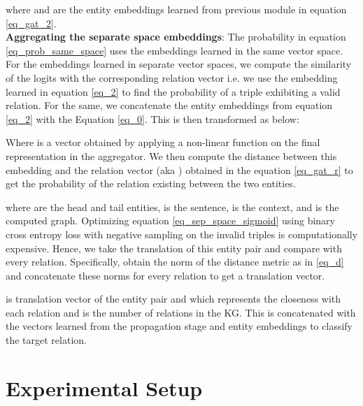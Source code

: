 \documentclass[sigconf]{acmart}
\begin{document}
where  and  are the entity embeddings learned from previous module in equation \ref{eq_gat_2}. \\
\textbf{Aggregating the separate space embeddings}: The probability in equation \ref{eq_prob_same_space} uses the embeddings learned in the same vector space. For the embeddings learned in separate vector spaces, we compute the similarity of the logits with the corresponding relation vector i.e. we use the embedding learned in equation \ref{eq_2} to find the probability of a triple exhibiting a valid relation. 
For the same, we concatenate the entity embeddings from equation \ref{eq_2} with the Equation \ref{eq_0}. This is then transformed as below:

 Where  is a vector obtained by applying a non-linear function  on the final representation in the aggregator. We then compute the distance between this embedding and the relation vector  (aka ) obtained in the equation \ref{eq_gat_r} to get the probability of the relation existing between the two entities.

where  are the head and tail entities,  is the sentence,  is the context, and  is the computed graph.
Optimizing equation \ref{eq_sep_space_sigmoid} using binary cross entropy loss with negative sampling on the invalid triples is computationally expensive. Hence, we take the translation of this entity pair and compare with every relation. Specifically, obtain the norm of the distance metric as in \ref{eq_d} and concatenate these norms for every relation to get a translation vector.



 is translation vector of the entity pair  and  which represents the closeness with each relation  and  is the number of relations in the KG. This is concatenated with the vectors learned from the propagation stage and entity embeddings to classify the target relation.
    



\section{Experimental Setup}\label{sec:experiment}
\end{document}
